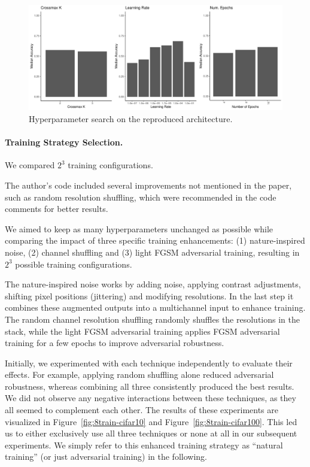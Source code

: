 \documentclass[a4paper, oneside]{discothesis}
\begin{document}
\begin{figure}
	\centering
	\includegraphics[width=1\columnwidth]{figures/hyperparams.pdf}
	\caption{Hyperparameter search on the reproduced architecture.}
	\label{fig:se-hyperparams}
\end{figure}

\paragraph{Training Strategy Selection.}

We compared $2^3$ training configurations.

The author's code included several improvements not mentioned in the paper, such as random resolution shuffling, which were recommended in the code comments for better results.

We aimed to keep as many hyperparameters unchanged as possible while comparing the impact of three specific training enhancements: (1) nature-inspired noise, (2) channel shuffling and (3) light FGSM adversarial training, resulting in $2^3$ possible training configurations.

The nature-inspired noise works by adding noise, applying contrast adjustments, shifting pixel positions (jittering) and modifying resolutions. In the last step it combines these augmented outputs into a multichannel input to enhance training. The random channel resolution shuffling randomly shuffles the resolutions in the stack, while the light FGSM adversarial training applies FGSM adversarial training for a few epochs to improve adversarial robustness.

Initially, we experimented with each technique independently to evaluate their effects. For example, applying random shuffling alone reduced adversarial robustness, whereas combining all three consistently produced the best results. We did not observe any negative interactions between these techniques, as they all seemed to complement each other. The results of these experiments are visualized in Figure~\ref{fig:8train-cifar10} and Figure~\ref{fig:8train-cifar100}. This led us to either exclusively use all three techniques or none at all in our subsequent experiments. We simply refer to this enhanced training strategy as ``natural training'' (or just adversarial training) in the following.
\end{document}
